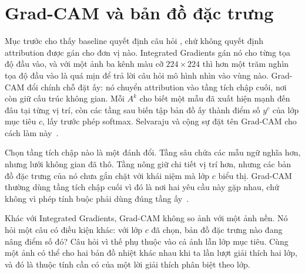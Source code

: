 \section{Grad-CAM và bản đồ đặc trưng}
\label{sec:ch05-grad-cam}

%
%
Mục trước cho thấy baseline quyết định câu hỏi ,
chứ không quyết
định attribution được gán cho đơn vị nào. Integrated Gradients gán nó cho từng
tọa độ đầu vào, và với một ảnh ba kênh màu cỡ $224\times224$ thì hơn một trăm nghìn
tọa độ đầu vào là quá mịn để trả lời câu hỏi mô hình nhìn vào vùng nào. Grad-CAM đổi chính
chỗ đặt ấy: nó chuyển attribution vào tầng tích chập cuối, nơi còn giữ cấu
trúc không gian. Mỗi 
$A^k$ cho biết một mẫu đã xuất hiện mạnh đến đâu tại từng vị trí, còn các tầng
sau biến tập bản đồ ấy thành điểm số $y^c$ của lớp mục tiêu $c$, lấy trước
phép softmax. Selvaraju và cộng sự đặt tên Grad-CAM cho cách làm
này~\autocite{p12gradcam}.

Chọn tầng tích chập nào là một đánh đổi. Tầng sâu chứa các mẫu ngữ nghĩa hơn,
nhưng lưới không gian đã thô. Tầng nông giữ chi tiết vị trí hơn, nhưng các
bản đồ đặc trưng của nó chưa gắn chặt với khái niệm mà lớp $c$ biểu thị.
Grad-CAM thường dùng tầng tích chập cuối vì đó là nơi hai yêu cầu này gặp
nhau, chứ không vì phép tính buộc phải dùng đúng tầng ấy~\autocite{p12gradcam}.

Khác với Integrated Gradients, Grad-CAM không so ảnh với một ảnh nền. Nó hỏi
một câu có điều kiện khác: với lớp $c$ đã chọn, bản đồ đặc trưng nào đang nâng
điểm số đó? Câu hỏi vì thế phụ thuộc vào cả ảnh lẫn lớp mục tiêu. Cùng một
ảnh có thể cho hai bản đồ nhiệt khác nhau khi ta lần lượt giải thích hai lớp,
và đó là thuộc tính cần có của một lời giải thích phân biệt theo lớp.

